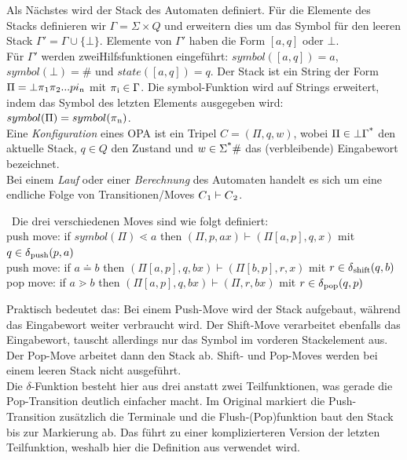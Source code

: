 Als Nächstes wird der Stack des Automaten definiert. Für die Elemente des Stacks definieren wir $\Gamma = \Sigma \times Q$ und erweitern dies um das Symbol für den leeren Stack $\Gamma ' = \Gamma \cup \{\bot\}$. Elemente von $\Gamma'$ haben die Form $\left[a, q\right]$ oder $\bot$.\\
Für $\Gamma ' $ werden zweiHilfsfunktionen eingeführt: $symbol(\left[ a, q \right]) = a$, $symbol(\bot) = \#$ und $state(\left[ a, q \right]) = q$. Der Stack ist ein String der Form $\Pi = \bot \pi \textsubscript{1} \pi \textsubscript{2}... pi\textsubscript{n}$ mit $\pi\textsubscript{i}\in \Gamma$. Die symbol-Funktion wird auf Strings erweitert, indem das Symbol des letzten Elements ausgegeben wird: $symbol(\Pi)=symbol(\pi \textsubscript{n})$.\\
Eine \textit{Konfiguration} eines OPA ist ein Tripel $C = (\Pi, q, w)$, wobei $\Pi \in \bot \Gamma \textsuperscript{*}$ den aktuelle Stack, $q \in Q$ den Zustand und $w \in \Sigma\textsuperscript{*}\#$ das (verbleibende) Eingabewort bezeichnet.\\
Bei einem \textit{Lauf} oder einer \textit{Berechnung} des Automaten handelt es sich um eine endliche Folge von Transitionen/Moves $C\textsubscript{1} \vdash C\textsubscript{2}$. 
\begin{definition}[Übergangsfunktionen]\ Die drei verschiedenen Moves sind wie folgt definiert: \\[1ex]
push move: if $symbol(\Pi) \lessdot a $ then $ (\Pi, p, ax) \vdash (\Pi\left[a, p \right], q, x)$ mit $q \in \delta\textsubscript{push}(p,a)$\\[0.5ex]  
push move: if $a \doteq b $ then $ (\Pi\left[a, p \right], q, bx) \vdash (\Pi\left[b, p \right], r, x)$ mit $r \in \delta \textsubscript{shift}(q,b)$\\[0.5ex]
pop move: if $a \gtrdot b $ then $ (\Pi\left[a, p \right], q, bx) \vdash (\Pi, r, bx)$ mit $r \in \delta \textsubscript{pop}(q,p)$
\end{definition}
Praktisch bedeutet das: Bei einem Push-Move wird der Stack aufgebaut, während das Eingabewort weiter verbraucht wird. Der Shift-Move verarbeitet ebenfalls das Eingabewort, tauscht allerdings nur das Symbol im vorderen Stackelement aus. Der Pop-Move arbeitet dann den Stack ab. Shift- und Pop-Moves werden bei einem leeren Stack nicht ausgeführt.\\
Die $\delta$-Funktion besteht hier aus drei anstatt zwei Teilfunktionen, was gerade die Pop-Transition deutlich einfacher macht. Im Original markiert die Push-Transition zusätzlich die Terminale und die Flush-(Pop)funktion baut den Stack bis zur Markierung ab. Das führt zu einer komplizierteren Version der letzten Teilfunktion, weshalb hier die Definition aus \cite{mso} verwendet wird.\\
